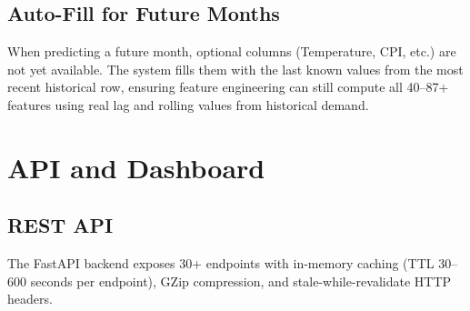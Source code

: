 \documentclass[conference]{IEEEtran}
\begin{document}
\subsection{Auto-Fill for Future Months}

When predicting a future month, optional columns (Temperature, CPI, etc.) are not yet available. The system fills them with the last known values from the most recent historical row, ensuring feature engineering can still compute all 40--87+ features using real lag and rolling values from historical demand.

\section{API and Dashboard}

\subsection{REST API}

The FastAPI backend exposes 30+ endpoints with in-memory caching (TTL 30--600 seconds per endpoint), GZip compression, and stale-while-revalidate HTTP headers.
\end{document}
